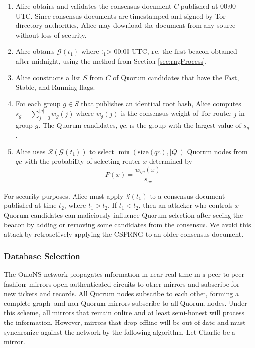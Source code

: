 \documentclass[USenglish,oneside,twocolumn]{article}
\begin{document}
\begin{enumerate}
	\item Alice obtains and validates the consensus document $ C $ published at 00:00 UTC. Since consensus documents are timestamped and signed by Tor directory authorities, Alice may download the document from any source without loss of security.
	\item Alice obtains $ \mathcal{G}( t_1 ) $ where $t_1$> 00:00 UTC, i.e. the first beacon obtained after midnight, using the method from Section \ref{sec:rngProcess}.
	\item Alice constructs a list $ S $ from $ C $ of Quorum candidates that have the Fast, Stable, and Running flags.
	\item For each group $ g \in S $ that publishes an identical root hash, Alice computes $ s_{g} = \sum_{j=0}^{\left\vert{g}\right\vert} w_{g}(j) $ where $ w_{g}(j) $ is the consensus weight of Tor router $ j $ in group $ g $. The Quorum candidates, $ \mathit{qc} $, is the group with the largest value of $ s_{g} $.
	\item Alice uses $ \mathcal{R}(\mathcal{G}(t_1)) $ to select $ \min(\mathrm{size}(\mathit{qc}), \left\vert{Q}\right\vert) $ Quorum nodes from $ \mathit{qc} $ with the probability of selecting router $ x $ determined by 
	\[
			P(x) = \frac{w_{\mathit{qc}}(x)}{s_{\mathit{qc}}}
	\]
\end{enumerate}

For security purposes, Alice must apply $ \mathcal{G}(t_{1}) $ to a consensus document published at time $ t_{2} $, where $ t_{1} > t_{2} $. If $ t_{1} < t_{2} $, then an attacker who controls $ x $ Quorum candidates can maliciously influence Quorum selection after seeing the beacon by adding or removing some candidates from the consensus. We avoid this attack by retroactively applying the CSPRNG to an older consensus document.

\subsubsection{Database Selection}

The OnioNS network propagates information in near real-time in a peer-to-peer fashion; mirrors open authenticated circuits to other mirrors and subscribe for new tickets and records. All Quorum nodes subscribe to each other, forming a complete graph, and non-Quorum mirrors subscribe to all Quorum nodes. Under this scheme, all mirrors that remain online and at least semi-honest will process the information. However, mirrors that drop offline will be out-of-date and must synchronize against the network by the following algorithm. Let Charlie be a mirror.
\end{document}

